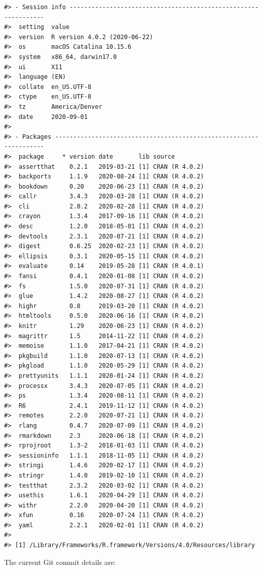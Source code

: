 \documentclass[
]{article}
\begin{document}
\begin{verbatim}
#> - Session info ---------------------------------------------------------------
#>  setting  value                       
#>  version  R version 4.0.2 (2020-06-22)
#>  os       macOS Catalina 10.15.6      
#>  system   x86_64, darwin17.0          
#>  ui       X11                         
#>  language (EN)                        
#>  collate  en_US.UTF-8                 
#>  ctype    en_US.UTF-8                 
#>  tz       America/Denver              
#>  date     2020-09-01                  
#> 
#> - Packages -------------------------------------------------------------------
#>  package     * version date       lib source        
#>  assertthat    0.2.1   2019-03-21 [1] CRAN (R 4.0.2)
#>  backports     1.1.9   2020-08-24 [1] CRAN (R 4.0.2)
#>  bookdown      0.20    2020-06-23 [1] CRAN (R 4.0.2)
#>  callr         3.4.3   2020-03-28 [1] CRAN (R 4.0.2)
#>  cli           2.0.2   2020-02-28 [1] CRAN (R 4.0.2)
#>  crayon        1.3.4   2017-09-16 [1] CRAN (R 4.0.2)
#>  desc          1.2.0   2018-05-01 [1] CRAN (R 4.0.2)
#>  devtools      2.3.1   2020-07-21 [1] CRAN (R 4.0.2)
#>  digest        0.6.25  2020-02-23 [1] CRAN (R 4.0.2)
#>  ellipsis      0.3.1   2020-05-15 [1] CRAN (R 4.0.2)
#>  evaluate      0.14    2019-05-28 [1] CRAN (R 4.0.1)
#>  fansi         0.4.1   2020-01-08 [1] CRAN (R 4.0.2)
#>  fs            1.5.0   2020-07-31 [1] CRAN (R 4.0.2)
#>  glue          1.4.2   2020-08-27 [1] CRAN (R 4.0.2)
#>  highr         0.8     2019-03-20 [1] CRAN (R 4.0.2)
#>  htmltools     0.5.0   2020-06-16 [1] CRAN (R 4.0.2)
#>  knitr         1.29    2020-06-23 [1] CRAN (R 4.0.2)
#>  magrittr      1.5     2014-11-22 [1] CRAN (R 4.0.2)
#>  memoise       1.1.0   2017-04-21 [1] CRAN (R 4.0.2)
#>  pkgbuild      1.1.0   2020-07-13 [1] CRAN (R 4.0.2)
#>  pkgload       1.1.0   2020-05-29 [1] CRAN (R 4.0.2)
#>  prettyunits   1.1.1   2020-01-24 [1] CRAN (R 4.0.2)
#>  processx      3.4.3   2020-07-05 [1] CRAN (R 4.0.2)
#>  ps            1.3.4   2020-08-11 [1] CRAN (R 4.0.2)
#>  R6            2.4.1   2019-11-12 [1] CRAN (R 4.0.2)
#>  remotes       2.2.0   2020-07-21 [1] CRAN (R 4.0.2)
#>  rlang         0.4.7   2020-07-09 [1] CRAN (R 4.0.2)
#>  rmarkdown     2.3     2020-06-18 [1] CRAN (R 4.0.2)
#>  rprojroot     1.3-2   2018-01-03 [1] CRAN (R 4.0.2)
#>  sessioninfo   1.1.1   2018-11-05 [1] CRAN (R 4.0.2)
#>  stringi       1.4.6   2020-02-17 [1] CRAN (R 4.0.2)
#>  stringr       1.4.0   2019-02-10 [1] CRAN (R 4.0.2)
#>  testthat      2.3.2   2020-03-02 [1] CRAN (R 4.0.2)
#>  usethis       1.6.1   2020-04-29 [1] CRAN (R 4.0.2)
#>  withr         2.2.0   2020-04-20 [1] CRAN (R 4.0.2)
#>  xfun          0.16    2020-07-24 [1] CRAN (R 4.0.2)
#>  yaml          2.2.1   2020-02-01 [1] CRAN (R 4.0.2)
#> 
#> [1] /Library/Frameworks/R.framework/Versions/4.0/Resources/library
\end{verbatim}

The current Git commit details are:
\end{document}
